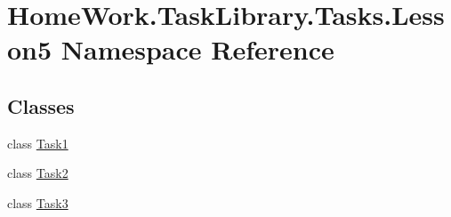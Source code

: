 \hypertarget{namespace_home_work_1_1_task_library_1_1_tasks_1_1_lesson5}{}\section{Home\+Work.\+Task\+Library.\+Tasks.\+Lesson5 Namespace Reference}
\label{namespace_home_work_1_1_task_library_1_1_tasks_1_1_lesson5}
\subsection*{Classes}
\begin{DoxyCompactItemize}
\item 
class \mbox{\hyperlink{class_home_work_1_1_task_library_1_1_tasks_1_1_lesson5_1_1_task1}{Task1}}
\item 
class \mbox{\hyperlink{class_home_work_1_1_task_library_1_1_tasks_1_1_lesson5_1_1_task2}{Task2}}
\item 
class \mbox{\hyperlink{class_home_work_1_1_task_library_1_1_tasks_1_1_lesson5_1_1_task3}{Task3}}
\end{DoxyCompactItemize}
